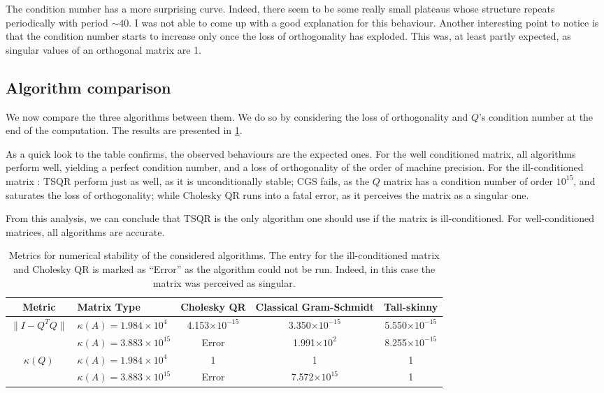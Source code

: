 \documentclass[a4paper, 12pt,oneside]{article}
\begin{document}
		The condition number has a more surprising curve. Indeed, there seem to be some really small plateaus whose structure repeats periodically with period $\sim 40$. I was not able to come up with a good explanation for this behaviour. Another interesting point to notice is that the condition number starts to increase only once the loss of orthogonality has exploded. This was, at least partly expected, as singular values of an orthogonal matrix are 1. 
		\subsection{Algorithm comparison}
		We now compare the three algorithms between them. We do so by considering the loss of orthogonality and $Q$'s condition number at the end of the computation. The results are presented in \ref{tab:numberical-stability}.

		As a quick look to the table confirms, the observed behaviours are the expected ones. For the well conditioned matrix, all algorithms perform well, yielding a perfect condition number, and a loss of orthogonality of the order of machine precision. For the ill-conditioned matrix : TSQR perform just as well, as it is unconditionally stable; CGS fails, as the $Q$ matrix has a condition number of order $10^{15}$, and saturates the loss of orthogonality; while Cholesky QR runs into a fatal error, as it perceives the matrix as a singular one.
		
		From this analysis, we can conclude that TSQR is the only algorithm one should use if the matrix is ill-conditioned. For well-conditioned matrices, all algorithms are accurate.  
		\begin{table}[h]
			\centering
			\begin{tabular}{|c|l|c|c|c|}
			\hline
			Metric                            & Matrix Type & Cholesky QR & Classical Gram-Schmidt & Tall-skinny     \\ \hline
			\multirow{2}{*}{$\|I-Q^TQ\|$} & $\kappa(A)=1.984\times 10^{4}$  & 4.153$\times 10^{-15}$ & 3.350$\times 10^{-15}$ & 5.550$\times 10^{-15}$ \\ \cline{2-5} 
											  & $\kappa(A)=3.883\times 10^{15}$ & Error & 1.991$\times 10^{2}$ & 8.255$\times 10^{-15}$ \\ \hline
			\multirow{2}{*}{$\kappa(Q)$} & $\kappa(A)=1.984\times 10^{4}$  & 1 & 1 & 1 \\ \cline{2-5} 
											  & $\kappa(A)=3.883\times 10^{15}$ & Error & 7.572$\times 10^{15}$ & 1 \\ \hline
			\end{tabular}
			\caption{Metrics for numerical stability of the considered algorithms. The entry for the ill-conditioned matrix and Cholesky QR is marked as ``Error'' as the algorithm could not be run. Indeed, in this case the matrix was perceived as singular.}
			\label{tab:numberical-stability}
			\end{table}
\end{document}

